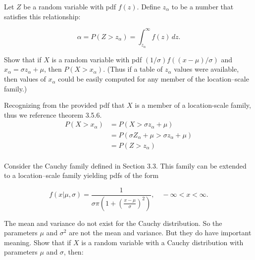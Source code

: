 \documentclass[12pt,letterpaper]{exam}
\begin{document}
\begin{questions}
	\setcounter{question}{37}
	\question 
	Let \(Z\) be a random variable with pdf \(f(z)\). Define \(z_\alpha\) to be a number that satisfies this relationship:
	
	\[\alpha = P(Z>z_\alpha) = \int_{z_\alpha}^{\infty} f(z) \,dz.\]
	
	Show that if \(X\) is a random variable with pdf \((1/\sigma)f((x-\mu)/\sigma)\) and \(x_\alpha=\sigma z_\alpha+\mu\),
	then \(P(X>x_\alpha)\).	(Thus if a table of \(z_\alpha\) values were available, then values of \(x_\alpha\) 
	could be easily computed for any member of the location–scale family.)
	
	\begin{solution}
		Recognizing from the provided pdf that \(X\) is a member of a location-scale family,
		thus we reference theorem 3.5.6.
		\begin{align*}
			P(X>x_\alpha)
			&= P(X> \sigma z_\alpha+\mu ) \\
			&= P(\sigma Z_\alpha+\mu> \sigma z_\alpha+\mu ) \\
			&= P(Z> z_\alpha ) \\
		\end{align*}
	\end{solution}
	
	\question 
	Consider the Cauchy family defined in Section 3.3. This family can be extended to a
	location–scale family yielding pdfs of the form
	
	\[f(x|\mu,\sigma) = \frac{1}{\sigma\pi \left(1 + \left(\frac{x-\mu}{\sigma}\right)^2 \right)} ,\quad -\infty<x<\infty.\]
	
	The mean and variance do not exist for the Cauchy distribution. So the parameters
	\(\mu\) and \(\sigma^2\) are not the mean and variance. But they do have important meaning. Show
	that if \(X\) is a random variable with a Cauchy distribution with parameters \(\mu\) and \(\sigma\),
	then:
	
	

\end{questions}
\end{document}
